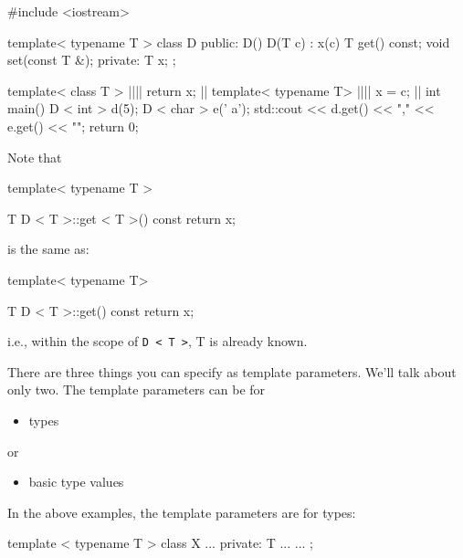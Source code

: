 \begin{consolethree}[escapeinside=||]
#include <iostream>

template< typename T >
class D {
public:
     D(){}
     D(T c) : x(c) {}
     T get() const;
     void set(const T &);
private:
     T x;
};

template< class T >
||||
{   
     return x;
}
||
template< typename T>
||||
{    
     x = c;
}
||
int main()
{   
     D < int > d(5);
     D < char > e(' a');
     std::cout << d.get() << ","
               << e.get() << "\n";
     return 0;
}
 
\end{consolethree}

Note that

\begin{console}
template< typename T >

T D < T >::get < T >() const
{    
     return x;
}
 
\end{console}

is the same as:

\begin{console}
template< typename T>

T D < T >::get() const
{    
     return x;
} 
\end{console}

i.e., within the scope of \texttt{D < T >}, T is already known.

\newpage{}

There are three things you can specify as template parameters.
We'll talk about only two. The template parameters can be for

\begin{itemize}
\item
  types
\end{itemize}
or
\begin{itemize}
\item
  basic type values
\end{itemize}

In the above examples, the template parameters are for types:

\begin{console}
template  < typename T >
class X
{
...
private:
     T ...
...
}; 
\end{console}

